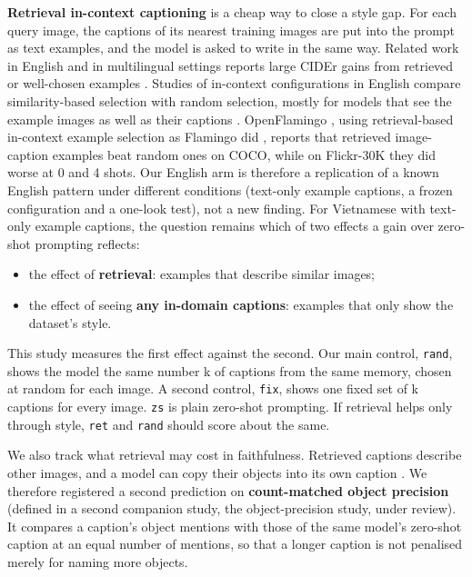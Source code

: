 \documentclass[manuscript,screen]{acmart}
\providecommand{\tightlist}{\setlength{\itemsep}{0pt}\setlength{\parskip}{0pt}}
\begin{document}
\textbf{Retrieval in-context captioning} is a cheap way to close a style gap. For each query image,
the captions of its nearest training images are put into the prompt as text examples, and the model
is asked to write in the same way. Related work in English and in multilingual settings reports
large CIDEr gains from retrieved or well-chosen examples
\citep{Yang2023ICLConfig, Ramos2023LMCap, Rebelo2025RSCap}. Studies of in-context configurations in
English compare similarity-based selection with random selection, mostly for models that see the
example images as well as their captions \citep{Yang2023ICLConfig, Li2025UnveilingICL}. OpenFlamingo
\citep{Awadalla2023OpenFlamingo}, using retrieval-based in-context example selection
\citep{Yang2022PICa} as Flamingo did \citep{Alayrac2022Flamingo}, reports that retrieved
image-caption examples beat random ones on COCO, while on Flickr-30K they did worse at 0 and 4
shots. Our English arm is therefore a replication of a known English pattern under different
conditions (text-only example captions, a frozen configuration and a one-look test), not a new
finding. For Vietnamese with text-only example captions, the question remains which of two effects a
gain over zero-shot prompting reflects:

\begin{itemize}
\tightlist
\item
  the effect of \textbf{retrieval}: examples that describe similar images;
\item
  the effect of seeing \textbf{any in-domain captions}: examples that only show the dataset's style.
\end{itemize}

This study measures the first effect against the second. Our main control, \texttt{rand}, shows the
model the same number k of captions from the same memory, chosen at random for each image. A second
control, \texttt{fix}, shows one fixed set of k captions for every image. \texttt{zs} is plain
zero-shot prompting. If retrieval helps only through style, \texttt{ret} and \texttt{rand} should
score about the same.

We also track what retrieval may cost in faithfulness. Retrieved captions describe other images, and
a model can copy their objects into its own caption \citep{Li2024RetrievalRobustness}. We therefore
registered a second prediction on \textbf{count-matched object precision} (defined in a second
companion study, the object-precision study, under review). It compares a caption's object mentions
with those of the same model's zero-shot caption at an equal number of mentions, so that a longer
caption is not penalised merely for naming more objects.
\end{document}
